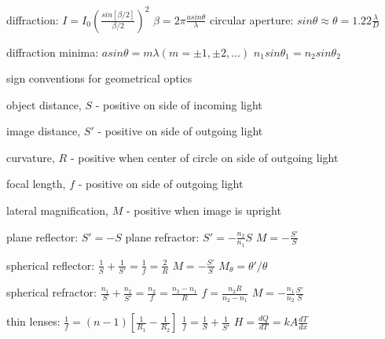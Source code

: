 \documentclass{exam}
\begin{document}
diffraction: $I = I_0 \left(\frac{sin[\beta/2]}{\beta/2}  \right)^2$ \hspace{2mm} $\beta = 2\pi\frac{a sin\theta}{\lambda}$
circular aperture: $sin\theta \approx \theta=1.22\frac{\lambda}{D}$



diffraction minima: $a sin\theta=m\lambda (m=\pm1, \pm2, ...)$
$n_1 sin\theta_1=n_2 sin\theta_2$

sign conventions for geometrical optics

object distance, $S$ - positive on side of incoming light

image distance, $S'$ - positive on side of outgoing light

curvature, $R$ - positive when center of circle on side of outgoing light

focal length, $f$ - positive on side of outgoing light

lateral magnification, $M$ - positive when image is upright


plane reflector: $S'=-S$
plane refractor: $S'=-\frac{n_2}{n_1}S$
$M=-\frac{S'}{S}$

spherical reflector: $\frac{1}{S} + \frac{1}{S'}=\frac{1}{f}=\frac{2}{R}$
$M=-\frac{S'}{S}$
$M_\theta=\theta'/\theta$

spherical refractor: $\frac{n_1}{S} + \frac{n_2}{S'}=\frac{n_2}{f}=\frac{n_2-n_1}{R}$
$f=\frac{n_2R}{n_2-n_1}$
$M=-\frac{n_1}{n_2}\frac{S'}{S}$

thin lenses: $\frac{1}{f}=(n-1)\left[\frac{1}{R_1}-\frac{1}{R_2}\right]$
$\frac{1}{f}=\frac{1}{S}+\frac{1}{S'}$
$H=\frac{dQ}{dT}=kA\frac{dT}{dx}$
\end{document}
